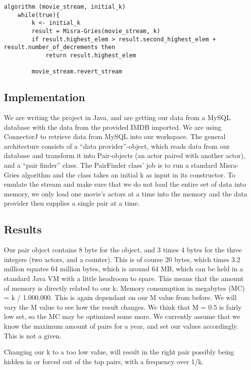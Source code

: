 \begin{verbatim}
algorithm (movie_stream, initial_k)
	while(true){
		k <- initial_k
		result = Misra-Gries(movie_stream, k)
		if result.highest_elem > result.second_highest_elem + result.number_of_decrements then
			return result.highest_elem
	
		movie_stream.revert_stream
\end{verbatim}

\subsection{Implementation}
\label{our_implementation}
We are writing the project in Java, and are getting our data from a MySQL database with the data from the provided IMDB imported. We are using ConnectorJ to retrieve data from MySQL into our workspace.
The general architecture consists of a “data provider”-object, which reads data from our database and transform it into Pair-objects (an actor paired with another actor), and a “pair finder” class. The PairFinder class’ job is to run a standard Misra-Gries algorithm and the class takes an initial k as input in its constructor. 
To emulate the stream and make sure that we do not load the entire set of data into memory, we only load one movie’s actors at a time into the memory and the data provider then supplies a single pair at a time.

\subsection{Results}
\label{our_results}
Our pair object contains 8 byte for the object, and 3 times 4 bytes for the three integers (two actors, and a counter). This is of course 20 bytes, which times 3.2 million equates 64 million bytes, which is around 64 MB, which can be held in a standard Java VM with a little headroom to spare. This means that the amount of memory is directly related to our k: Memory consumption in megabytes (MC) = k / 1.000.000. This is again dependant on our M value from before. We will vary the M value to see how the result changes. We think that M = 0.5 is fairly low set, so the MC may be optimized some more. We currently assume that we know the maximum amount of pairs for a year, and set our values accordingly. This is not a given. 

Changing our k to a too low value, will result in the right pair possibly being hidden in or forced out of the top pairs, with a frequency over 1/k.

